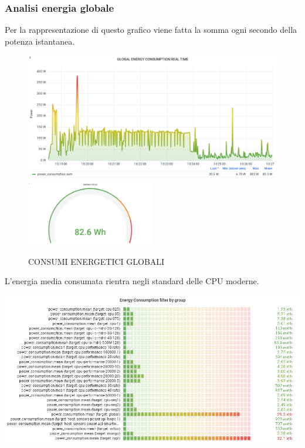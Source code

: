 \documentclass[a4paper, 11pt]{article}
\begin{document}
\subsubsection{Analisi energia globale}
\begin{flushleft}
Per la rappresentazione di questo grafico viene fatta la somma ogni secondo della potenza istantanea.
\end{flushleft}
\begin{figure}[h]
\caption{CONSUMI ENERGETICI GLOBALI}
\centering
\includegraphics[scale=0.4]{image2}
\includegraphics[scale=0.4, width=0.5\textwidth]{image43}
\end{figure}
\begin{flushleft}
L'energia media consumata rientra negli standard delle CPU moderne.
\end{flushleft}
\includegraphics[scale=0.4]{image41}
\clearpage
\end{document}
